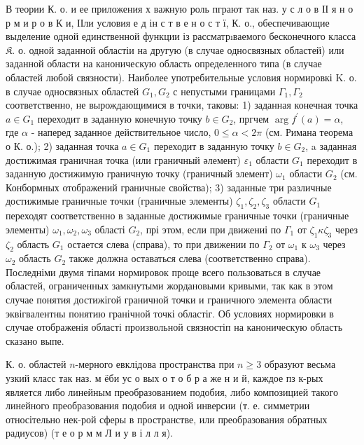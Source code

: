 \documentclass[10pt]{article}
\begin{document}
В теории К. о. и ее приложения х важную роль пграют так наз. у с л о в ІІ я н о р м и р о в К и, ІІли условия е д ін с т в е н о с т ї, К. о., обеспечивающие выделение одной единственной функции із рассматрıваемого бесконечного класса $\mathfrak{K}$. о. одной заданной областіи на другую (в случае односвязных областей) или заданной области на каноническую область определенного типа (в случае областей любой связности). Наиболее употребительные условия нормировкі K. о. в случае односвязных областей $G_{1}, G_{2}$ с непустыми границами $\Gamma_{1}, \Gamma_{2}$ соответственно, не вырождающимися в точки, таковы: 1) заданная конечная точка $a \in G_{1}$ переходит в заданную конечную точку $b \in G_{2}$, пргчем $\arg f^{\prime}(a)=\alpha$, где $\alpha$ - наперед заданное действительное число, $0 \leqslant \alpha<2 \pi$ (см. Римана теорема о К. о.); 2) заданная точка $a \in G_{1}$ переходит в заданную точку $b \in G_{2}$, a заданная достижимая граничная точка (или граничный әлемент) $\varepsilon_{1}$ области $G_{1}$ переходит в заданную достижимую граничную точку (граничный элемент) $\omega_{1}$ области $G_{2}$ (см. Конбормных отображений граничные свойства); 3) заданные три различные достижимые граничные точки (граничные элементы) $\zeta_{1}, \zeta_{2}, \zeta_{3}$ области $G_{1}$ переходят соответственно в заданные достижимые граничные точки (граничные элементы) $\omega_{1}, \omega_{2}, \omega_{3}$ області $G_{2}$, прі этом, если при движениі по $\Gamma_{1}$ от $\zeta_{1} \kappa \zeta_{3}$ через $\zeta_{2}$ область $G_{1}$ остается слева (справа), то при движении по $\Gamma_{2}$ от $\omega_{1}$ к $\omega_{3}$ через $\omega_{2}$ область $G_{2}$ также должна оставаться слева (соответственно справа). Последніми двумя тіпами нормировок проще всего пользоваться в случае областей, ограниченных замкнутыми жордановыми кривыми, так как в этом случае понятия достижігой граничной точки и граничного элемента области эквігвалентны понятию гранічной точкі областіг. Об условиях нормировки в случае отображенія області произвольной связностіп на каноническую область сказано выпе.



К. о. областей $n$-мерного евклідова пространства при $n \geqslant 3$ образуют весьма узкий класс так наз. м ёби ус о вых о т о б р а же н и й, каждое пз к-рых является либо линейным преобразованием подобия, либо композицией такого линейного преобразования подобия и одной инверсии (т. е. симметрии относітельно нек-рой сферы в пространстве, или преобразования обратных радиусов) (т е о р м м Л и у в і л л я).
\end{document}
